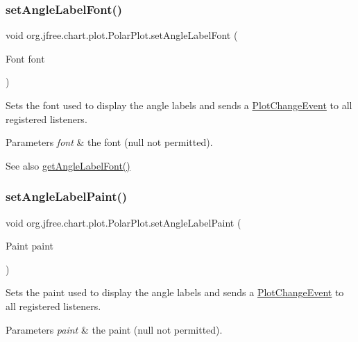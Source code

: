 \subsubsection{\texorpdfstring{set\+Angle\+Label\+Font()}{setAngleLabelFont()}}
{\footnotesize\ttfamily void org.\+jfree.\+chart.\+plot.\+Polar\+Plot.\+set\+Angle\+Label\+Font (\begin{DoxyParamCaption}\item[{Font}]{font }\end{DoxyParamCaption})}

Sets the font used to display the angle labels and sends a \mbox{\hyperlink{}{Plot\+Change\+Event}} to all registered listeners.


\begin{DoxyParams}{Parameters}
{\em font} & the font ({\ttfamily null} not permitted).\\
\hline
\end{DoxyParams}
\begin{DoxySeeAlso}{See also}
\mbox{\hyperlink{classorg_1_1jfree_1_1chart_1_1plot_1_1_polar_plot_a928d0e6ae6b209ca6172b710c0b2190a}{get\+Angle\+Label\+Font()}} 
\end{DoxySeeAlso}
\mbox{\label{classorg_1_1jfree_1_1chart_1_1plot_1_1_polar_plot_a99d459dade42417f00c7cd05f506b9a5}} 
\subsubsection{\texorpdfstring{set\+Angle\+Label\+Paint()}{setAngleLabelPaint()}}
{\footnotesize\ttfamily void org.\+jfree.\+chart.\+plot.\+Polar\+Plot.\+set\+Angle\+Label\+Paint (\begin{DoxyParamCaption}\item[{Paint}]{paint }\end{DoxyParamCaption})}

Sets the paint used to display the angle labels and sends a \mbox{\hyperlink{}{Plot\+Change\+Event}} to all registered listeners.


\begin{DoxyParams}{Parameters}
{\em paint} & the paint ({\ttfamily null} not permitted). \\
\hline
\end{DoxyParams}
\mbox{\label{classorg_1_1jfree_1_1chart_1_1plot_1_1_polar_plot_a8cb293fa3da434fb3ebcbe1ef1ccb435}} 
